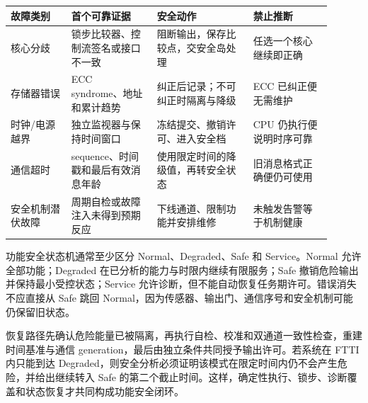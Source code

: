 \begin{longtable}{L{0.17\linewidth}L{0.24\linewidth}L{0.27\linewidth}L{0.22\linewidth}}
\toprule
故障类别 & 首个可靠证据 & 安全动作 & 禁止推断 \\
\midrule
核心分歧 & 锁步比较器、控制流签名或接口不一致 & 阻断输出，保存比较点，交安全岛处理 & 任选一个核心继续即正确 \\\tablerowrule
存储器错误 & ECC syndrome、地址和累计趋势 & 纠正后记录；不可纠正时隔离与降级 & ECC 已纠正便无需维护 \\\tablerowrule
时钟/电源越界 & 独立监视器与保持时间窗口 & 冻结提交、撤销许可、进入安全档 & CPU 仍执行便说明时序可靠 \\\tablerowrule
通信超时 & sequence、时间戳和最后有效消息年龄 & 使用限定时间的降级值，再转安全状态 & 旧消息格式正确便仍可使用 \\\tablerowrule
安全机制潜伏故障 & 周期自检或故障注入未得到预期反应 & 下线通道、限制功能并安排维修 & 未触发告警等于机制健康 \\
\bottomrule
\end{longtable}


功能安全状态机通常至少区分 Normal、Degraded、Safe 和 Service。Normal 允许全部功能；Degraded 在已分析的能力与时限内继续有限服务；Safe 撤销危险输出并保持最小受控状态；Service 允许诊断，但不能自动恢复任务期许可。错误消失不应直接从 Safe 跳回 Normal，因为传感器、输出门、通信序号和安全机制可能仍保留旧状态。

恢复路径先确认危险能量已被隔离，再执行自检、校准和双通道一致性检查，重建时间基准与通信 generation，最后由独立条件共同授予输出许可。若系统在 FTTI 内只能到达 Degraded，则安全分析必须证明该模式在限定时间内仍不会产生危险，并给出继续转入 Safe 的第二个截止时间。这样，确定性执行、锁步、诊断覆盖和状态恢复才共同构成功能安全闭环。
